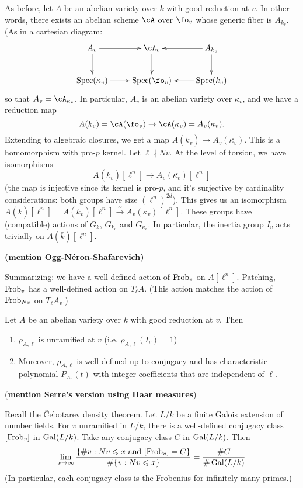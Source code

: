 As before, let $A$ be an abelian variety over $k$ with good reduction at $v$. 
In other words, there exists an abelian scheme $\cA$ over $\fo_v$ whose generic 
fiber is $A_{k_v}$. (As in a cartesian diagram:
\[\xymatrix{
  A_v \ar[r] \ar[d] 
    & \cA_v \ar[d] 
    & A_{k_v} \ar[l] \ar[d] \\
  \spec(\kappa_v) \ar[r] 
    & \spec(\fo_v) 
    & \spec(k_v) \ar[l] 
}\]
so that $A_v = \cA_{\kappa_v}$. In particular, $A_v$ is an abelian variety over 
$\kappa_v$, and we have a reduction map 
\[
  A(k_v) = \cA(\fo_v) \to \cA(\kappa_v) = A_v(\kappa_v) \text{.}
\]
Extending to algebraic closures, we get a map 
$A(\overline{k_v}) \to A_v(\overline{\kappa_v})$. This is a homomorphism with 
pro-$p$ kernel. Let $\ell\nmid N v$. At the level of torsion, we have 
isomorphisms 
\[
  A(\overline{k_v})[\ell^n] \to A_v(\overline{\kappa_v})[\ell^n]
\]
(the map is injective since its kernel is pro-$p$, and it's surjective by 
cardinality considerations: both groups have size $(\ell^n)^{2 d}$). This gives 
us an isomorphism 
$A(\bar k)[\ell^n] = A(\overline{k_v})[\ell^n]\xrightarrow\sim A_v(\kappa_v)[\ell^n]$. 
These groups have (compatible) actions of $G_k$, $G_{k_v}$ and $G_{\kappa_v}$. In 
particular, the inertia group $I_v$ acts trivially on $A(\bar k)[\ell^n]$. 

\textbf{(mention Ogg-N\'eron-Shafarevich)}

Summarizing: we have a well-defined action of $\mathrm{Frob}_v$ on $A[\ell^n]$. 
Patching, $\mathrm{Frob}_v$ has a well-defined action on $T_\ell A$. (This action 
matches the action of $\mathrm{Frob}_{N v}$ on $T_\ell A_v$.) 

\begin{theorem}
Let $A$ be an abelian variety over $k$ with good reduction at $v$. Then 
\begin{enumerate}
  \item $\rho_{A,\ell}$ is unramified at $v$ (i.e. $\rho_{A,\ell}(I_v) = 1$) 
  \item Moreover, $\rho_{A,\ell}$ is well-defined up to conjugacy and has 
    characteristic polynomial $P_{A_v}(t)$ with integer coefficients that are 
    independent of $\ell$. 
\end{enumerate}
\end{theorem}

(\textbf{mention Serre's version using Haar measures})

Recall the \v Cebotarev density theorem. Let $L/k$ be a finite Galois extension 
of number fields. For $v$ unramified in $L/k$, there is a well-defined 
conjugacy class $[\mathrm{Frob}_v]$ in $\operatorname{Gal}(L/k)$. Take any conjugacy class $C$ in 
$\operatorname{Gal}(L/k)$. Then 
\[
  \lim_{x \to \infty} \frac{\{\# v : N v \leqslant x \text{ and } [\mathrm{Frob}_v]=C\}}{\# \{v:N v\leqslant x\}} = \frac{\# C}{\# \operatorname{Gal}(L/k)}
\]
(In particular, each conjugacy class is the Frobenius for infinitely many 
primes.) 

